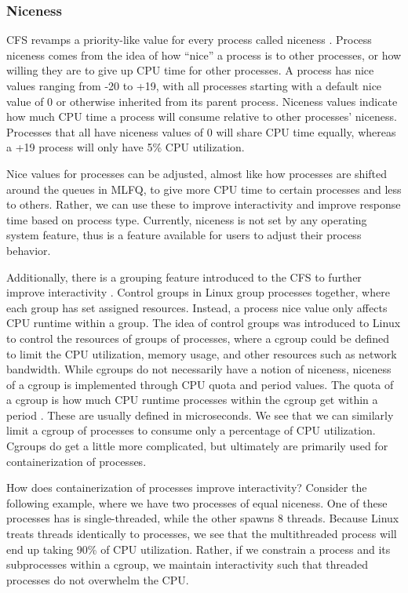 \documentclass[12pt]{article}
\def\ind{\hspace*{0.3in}}
\begin{document}
\subsubsection*{Niceness}

\ind CFS revamps a priority-like value for every process called niceness \cite{InfluenceSchedulingPriority2006}. Process niceness comes from the idea of how ``nice'' a process is to other processes, or how willing they are to give up CPU time for other processes. A process has nice values ranging from -20 to +19, with all processes starting with a default nice value of 0 or otherwise inherited from its parent process. Niceness values indicate how much CPU time a process will consume relative to other processes' niceness. Processes that all have niceness values of 0 will share CPU time equally, whereas a +19 process will only have 5\% CPU utilization. 

Nice values for processes can be adjusted, almost like how processes are shifted around the queues in MLFQ, to give more CPU time to certain processes and less to others. Rather, we can use these to improve interactivity and improve response time based on process type. Currently, niceness is not set by any operating system feature, thus is a feature available for users to adjust their process behavior. 

Additionally, there is a grouping feature introduced to the CFS to further improve interactivity \cite{heoControlGroupV22015,ControlGroupsLinux}. Control groups in Linux group processes together, where each group has set assigned resources. Instead, a process nice value only affects CPU runtime within a group. The idea of control groups was introduced to Linux to control the resources of groups of processes, where a cgroup could be defined to limit the CPU utilization, memory usage, and other resources such as network bandwidth. While cgroups do not necessarily have a notion of niceness, niceness of a cgroup is implemented through CPU quota and period values. The quota of a cgroup is how much CPU runtime processes within the cgroup get within a period \cite{seltzerUnderstandingCgroups2018}. These are usually defined in microseconds. We see that we can similarly limit a cgroup of processes to consume only a percentage of CPU utilization. Cgroups do get a little more complicated, but ultimately are primarily used for containerization of processes.

How does containerization of processes improve interactivity? Consider the following example, where we have two processes of equal niceness. One of these processes has is single-threaded, while the other spawns 8 threads. Because Linux treats threads identically to processes, we see that the multithreaded process will end up taking 90\% of CPU utilization. Rather, if we constrain a process and its subprocesses within a cgroup, we maintain interactivity such that threaded processes do not overwhelm the CPU.
\end{document}
